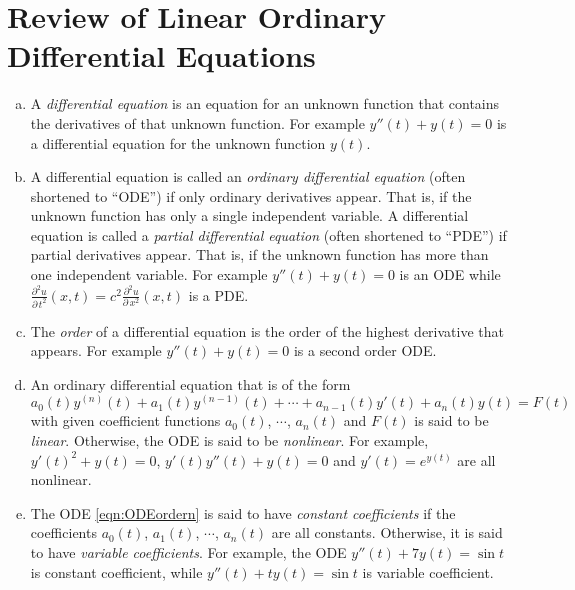 \graphicspath{{figures/ode/}}

\renewcommand{\theequation}{\thechapter.\arabic{equation}}
\renewcommand{\thetheorem}{\thechapter.\arabic{theorem}}
\renewcommand{\thebc}{\thechapter.\arabic{theorem}}
\renewcommand{\theeg}{\thechapter.\arabic{theorem}}


\chapter{Review of Linear Ordinary Differential Equations}\label{ap:ODE}


\begin{defn}\label{def:apODE}
\begin{enumerate}[(a)]
\item %
A \emph{differential equation} is an equation for an
unknown function that contains the derivatives of that unknown function.
For example $y''(t)+y(t)=0$ is a differential equation for the unknown 
function $y(t)$.

\item %
A differential equation is called an \emph{ordinary differential
equation} (often shortened to ``ODE'') if only ordinary derivatives 
appear. That is, if the unknown function has only a single independent
variable. A differential equation is called a \emph{partial differential
equation} (often shortened to ``PDE'') if partial derivatives 
appear. That is, if the unknown function has more than one independent
variable. For example $y''(t)+y(t)=0$ is an ODE while
$\frac{\partial^2 u}{\partial\, t^2}(x,t)=c^2 
\frac{\partial^2 u}{\partial\, x^2}(x,t)$ is a PDE.

\item %
The \emph{order} of a differential equation is the order of the
highest derivative that appears. For example $y''(t)+y(t)=0$ 
is a second order ODE.

\item %
An ordinary differential equation that is of the form
\begin{equation}\label{eqn:ODEordern}
a_0(t) y^{(n)}(t) + a_1(t) y^{(n-1)}(t)+\cdots+a_{n-1}(t) y'(t) +a_n(t)y(t)
=F(t)
\end{equation}
with given coefficient functions $a_0(t)$, $\cdots$, $a_n(t)$ and $F(t)$ 
is said to be \emph{linear}. Otherwise, the ODE is said to be \emph{nonlinear}.
For example, $y'(t)^2+y(t)=0$, $y'(t)y''(t)+y(t)=0$ and $y'(t)=e^{y(t)}$
are all nonlinear.

\item %
The ODE \eqref{eqn:ODEordern} is said to have \emph{constant coefficients} if
the coefficients  $a_0(t)$, $a_1(t)$, $\cdots$, $a_n(t)$ are all constants. Otherwise,
it is said to have \emph{variable coefficients}. For example,
the ODE $y''(t)+7y(t)=\sin t$ is constant coefficient, while 
$y''(t)+ty(t)=\sin t$ is variable coefficient.

\end{enumerate}
\end{defn}

